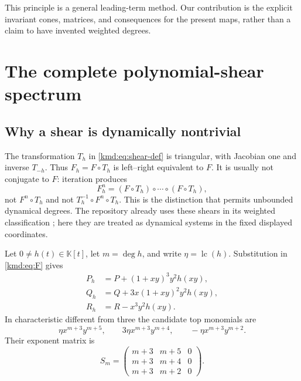 \documentclass[11pt,a4paper]{article}
\numberwithin{equation}{section}
\theoremstyle{definition}
\theoremstyle{remark}
\newcommand{\K}{\mathbb K}
\newcommand{\dd}{\operatorname{deg}}
\newcommand{\lc}{\operatorname{lc}}
\begin{document}
This principle is a general leading-term method. Our contribution is
the explicit invariant cones, matrices, and consequences for the
present maps, rather than a claim to have invented weighted degrees.

\section{The complete polynomial-shear spectrum}\label{kmd:sec:shear}

\subsection{Why a shear is dynamically nontrivial}
The transformation $T_h$ in \eqref{kmd:eq:shear-def} is triangular, with
Jacobian one and inverse $T_{-h}$. Thus $F_h=F\circ T_h$ is
left--right equivalent to $F$. It is usually not conjugate to $F$:
iteration produces
\[
 F_h^n=(F\circ T_h)\circ\cdots\circ(F\circ T_h),
\]
not $F^n\circ T_h$ and not $T_h^{-1}\circ F^n\circ T_h$.
This is the distinction that permits unbounded dynamical degrees.
The repository already uses these shears in its weighted
classification \cite{weighted}; here they are treated as dynamical
systems in the fixed displayed coordinates.

Let $0\ne h(t)\in\K[t]$, let $m=\dd h$, and write
$\eta=\lc(h)$. Substitution in \eqref{kmd:eq:F} gives
\begin{align}
 P_h&=P+(1+xy)^3y^2h(xy),\nonumber\\
 Q_h&=Q+3x(1+xy)^2y^2h(xy),\label{kmd:eq:shear-components}\\
 R_h&=R-x^3y^2h(xy).\nonumber
\end{align}
In characteristic different from three the candidate top monomials
are
\begin{equation}
 \eta x^{m+3}y^{m+5},\qquad
 3\eta x^{m+3}y^{m+4},\qquad
 -\eta x^{m+3}y^{m+2}.
 \label{kmd:eq:shear-top}
\end{equation}
Their exponent matrix is
\begin{equation}
 S_m=\begin{pmatrix}
 m+3&m+5&0\\m+3&m+4&0\\m+3&m+2&0
 \end{pmatrix}.
 \label{kmd:eq:S}
\end{equation}
\end{document}
